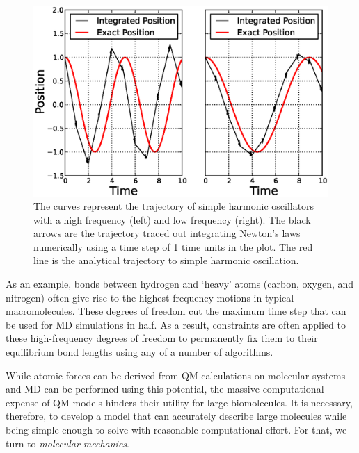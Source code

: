 \begin{figure}
   \includegraphics[width=6.5in]{TimeStepDemo.ps}
   \caption[The curves represent the trajectory of simple harmonic oscillators
            with a high frequency (left) and low frequency (right).]
           {The curves represent the trajectory of simple harmonic oscillators
            with a high frequency (left) and low frequency (right). The black
            arrows are the trajectory traced out integrating Newton's laws
            numerically using a time step of 1 time units in the plot. The
            red line is the analytical trajectory to simple harmonic
            oscillation.}
   \label{fig1:TimeStepDemo}
\end{figure}

As an example, bonds between hydrogen and `heavy' atoms (\eg carbon, oxygen, and
nitrogen) often give rise to the highest frequency motions in typical
macromolecules. These degrees of freedom cut the maximum time step that can be
used for MD simulations in half. As a result, constraints are often applied to
these high-frequency degrees of freedom to permanently fix them to their
equilibrium bond lengths using any of a number of algorithms.
\cite{Ryckaert_JComputPhys_1977_v23_p327, Andersen1983,
Miyamoto_JComputChem_1992_v13_p952, Forester_JComputChem_1998_v19_p102,
Lee_JComputPhys_2005_v210_p171}

While atomic forces can be derived from QM calculations on molecular systems and
MD can be performed using this potential, the massive computational expense of
QM models hinders their utility for large biomolecules. It is necessary,
therefore, to develop a model that can accurately describe large molecules while
being simple enough to solve with reasonable computational effort. For that, we
turn to \emph{molecular mechanics}.

